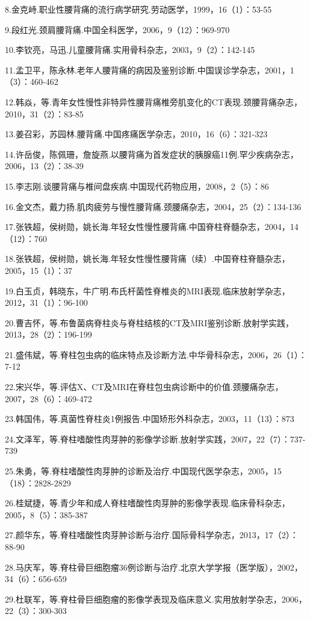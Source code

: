 8.金克峙.职业性腰背痛的流行病学研究.劳动医学，1999，16（1）：53-55

9.段红光.颈肩腰背痛.中国全科医学，2006，9（12）：969-970

10.李钦亮，马迅.儿童腰背痛.实用骨科杂志，2003，9（2）：142-145

11.孟卫平，陈永林.老年人腰背痛的病因及鉴别诊断.中国误诊学杂志，2001，1（3）：460-462

12.韩焱，等.青年女性慢性非特异性腰背痛椎旁肌变化的CT表现.颈腰背痛杂志，2010，31（2）：83-85

13.姜召彩，苏园林.腰背痛.中国疼痛医学杂志，2010，16（6）：321-323

14.许岳俊，陈佩珊，詹旋燕.以腰背痛为首发症状的胰腺癌11例.罕少疾病杂志，2006，13（2）：38-39

15.李志刚.谈腰背痛与椎间盘疾病.中国现代药物应用，2008，2（5）：86

16.金文杰，戴力扬.肌肉疲劳与慢性腰背痛.颈腰痛杂志，2004，25（2）：134-136

17.张铁超，侯树勋，姚长海.年轻女性慢性腰背痛.中国脊柱脊髓杂志，2004，14（12）：760

18.张铁超，侯树勋，姚长海.年轻女性慢性腰背痛（续）.中国脊柱脊髓杂志，2005，15（1）：37

19.白玉贞，韩晓东，牛广明.布氏杆菌性脊椎炎的MRI表现.临床放射学杂志，2012，31（1）：96-100

20.曹吉怀，等.布鲁菌病脊柱炎与脊柱结核的CT及MRI鉴别诊断.放射学实践，2013，28（2）：196-199

21.盛伟斌，等.脊柱包虫病的临床特点及诊断方法.中华骨科杂志，2006，26（1）：7-12

22.宋兴华，等.评估X、CT及MRI在脊柱包虫病诊断中的价值.颈腰痛杂志，2007，28（6）：469-472

23.韩国伟，等.真菌性脊柱炎1例报告.中国矫形外科杂志，2003，11（13）：873

24.文泽军，等.脊柱嗜酸性肉芽肿的影像学诊断.放射学实践，2007，22（7）：737-739

25.朱勇，等.脊柱嗜酸性肉芽肿的诊断及治疗.中国现代医学杂志，2005，15（18）：2828-2829

26.桂斌捷，等.青少年和成人脊柱嗜酸性肉芽肿的影像学表现.临床骨科杂志，2005，8（5）：385-387

27.颜华东，等.脊柱嗜酸性肉芽肿诊断与治疗.国际骨科学杂志，2013，17（2）：88-90

28.马庆军，等.脊柱骨巨细胞瘤36例诊断与治疗.北京大学学报（医学版），2002，34（6）：656-659

29.杜联军，等.脊柱骨巨细胞瘤的影像学表现及临床意义.实用放射学杂志，2006，22（3）：300-303

